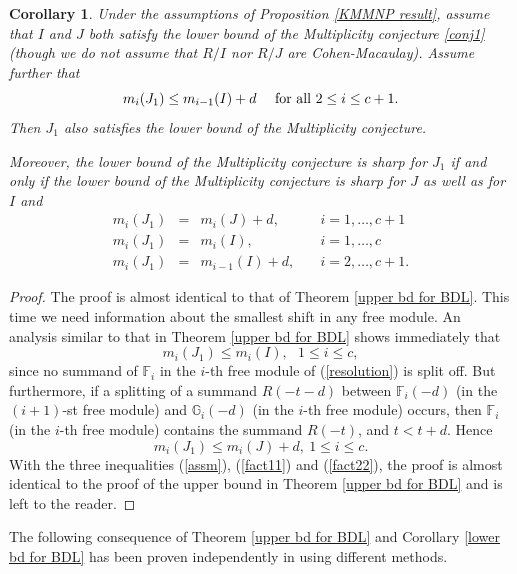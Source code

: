 \documentclass[12pt,twoside]{amsart}
\numberwithin{equation}{section}
\newtheorem{corollary}[theorem]{Corollary}
\theoremstyle{definition}
\begin{document}
\begin{corollary} \label{lower bd for BDL}
Under the assumptions of Proposition \ref{KMMNP result}, assume that $I$ and $J$ both
 satisfy the lower bound of the Multiplicity conjecture \ref{conj1} (though we do not assume that
 $R/I$ nor $R/J$ are Cohen-Macaulay).
Assume further that
\begin{equation}\label{assm}
m_i(J_1) \leq m_{i-1}(I)+d \ \ \ \hbox{ for all $2 \leq i \leq c+1$}.
\end{equation}
Then $J_1$ also satisfies the lower bound of the Multiplicity conjecture.

Moreover, the lower bound of the Multiplicity conjecture is sharp for $J_1$ if and only
if the lower bound of the Multiplicity conjecture is sharp for $J$ as well as for $I$ and
$$
\begin{array}{rcll}
m_i (J_1) & = & m_i (J) + d, \quad  & i = 1,\ldots,c+1 \\
m_i (J_1) & =  & m_i (I), \quad & i = 1,\ldots,c \\
m_i (J_1) & =  & m_{i-1} (I) + d , \quad & i = 2,\ldots,c+1.
\end{array}
$$
\end{corollary}

\begin{proof}
The proof is almost identical to that of Theorem \ref{upper bd for BDL}.  This time we need information about the smallest shift in any free module.
An analysis similar to that in Theorem \ref{upper bd for BDL} shows immediately that
\begin{equation}\label{fact11}
m_i(J_1) \leq m_i(I), \ \ \  1 \leq i \leq c,
\end{equation}
since no summand of $\mathbb F_i$ in the $i$-th free module of
(\ref{resolution}) is split off.
  But furthermore, if a splitting of a summand $R(-t-d)$ between ${\mathbb F}_{i} (-d)$ (in the $(i+1)$-st free module) and ${\mathbb G}_i (-d)$ (in the $i$-th free module) occurs, then
$\mathbb F_i$ (in the $i$-th free module) contains the summand $R(-t)$, and $t
< t+d$.  Hence
\begin{equation} \label{fact22}
m_i(J_1) \leq m_i(J)+d, \ 1 \leq i \leq c.
\end{equation}
With the three inequalities (\ref{assm}), (\ref{fact11}) and (\ref{fact22}), the proof is almost identical to the proof of the upper bound in Theorem \ref{upper bd for BDL} and is left to the reader.
\end{proof}

The following consequence of Theorem \ref{upper bd for BDL} and Corollary \ref{lower bd
for BDL}  has been proven independently in \cite{H} using different methods.
\end{document}
